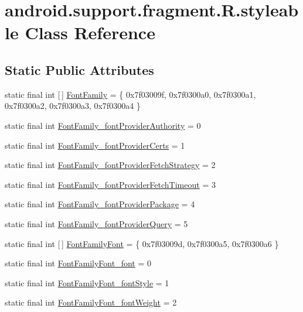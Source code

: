 \hypertarget{classandroid_1_1support_1_1fragment_1_1R_1_1styleable}{}\section{android.\+support.\+fragment.\+R.\+styleable Class Reference}
\label{classandroid_1_1support_1_1fragment_1_1R_1_1styleable}
\subsection*{Static Public Attributes}
\begin{DoxyCompactItemize}
\item 
static final int \mbox{[}$\,$\mbox{]} \mbox{\hyperlink{classandroid_1_1support_1_1fragment_1_1R_1_1styleable_acd39da1767883d81cab91bd19f249ade}{Font\+Family}} = \{ 0x7f03009f, 0x7f0300a0, 0x7f0300a1, 0x7f0300a2, 0x7f0300a3, 0x7f0300a4 \}
\item 
static final int \mbox{\hyperlink{classandroid_1_1support_1_1fragment_1_1R_1_1styleable_af882ad85c2e1383838bc96d605a00f76}{Font\+Family\+\_\+font\+Provider\+Authority}} = 0
\item 
static final int \mbox{\hyperlink{classandroid_1_1support_1_1fragment_1_1R_1_1styleable_a2f5b080e76f076dce91ebd79cddc7fce}{Font\+Family\+\_\+font\+Provider\+Certs}} = 1
\item 
static final int \mbox{\hyperlink{classandroid_1_1support_1_1fragment_1_1R_1_1styleable_ae0d9042918b64eff94b0664ae927c9c6}{Font\+Family\+\_\+font\+Provider\+Fetch\+Strategy}} = 2
\item 
static final int \mbox{\hyperlink{classandroid_1_1support_1_1fragment_1_1R_1_1styleable_addd27da5fab321928d045365a69aece2}{Font\+Family\+\_\+font\+Provider\+Fetch\+Timeout}} = 3
\item 
static final int \mbox{\hyperlink{classandroid_1_1support_1_1fragment_1_1R_1_1styleable_a6bb0c9813ac5a2338c2b471258acb1bf}{Font\+Family\+\_\+font\+Provider\+Package}} = 4
\item 
static final int \mbox{\hyperlink{classandroid_1_1support_1_1fragment_1_1R_1_1styleable_a1870e814488c7810c02d4276af3e98b1}{Font\+Family\+\_\+font\+Provider\+Query}} = 5
\item 
static final int \mbox{[}$\,$\mbox{]} \mbox{\hyperlink{classandroid_1_1support_1_1fragment_1_1R_1_1styleable_acf7592da384ccfd4ba1c8883aeedacea}{Font\+Family\+Font}} = \{ 0x7f03009d, 0x7f0300a5, 0x7f0300a6 \}
\item 
static final int \mbox{\hyperlink{classandroid_1_1support_1_1fragment_1_1R_1_1styleable_a519398e96e67e402ee501e3cc0f0fc54}{Font\+Family\+Font\+\_\+font}} = 0
\item 
static final int \mbox{\hyperlink{classandroid_1_1support_1_1fragment_1_1R_1_1styleable_af95cbf52f566f94888d1a44ec8f46fd5}{Font\+Family\+Font\+\_\+font\+Style}} = 1
\item 
static final int \mbox{\hyperlink{classandroid_1_1support_1_1fragment_1_1R_1_1styleable_a8af402b9cdd397b2b12747e94e2e362c}{Font\+Family\+Font\+\_\+font\+Weight}} = 2
\end{DoxyCompactItemize}


